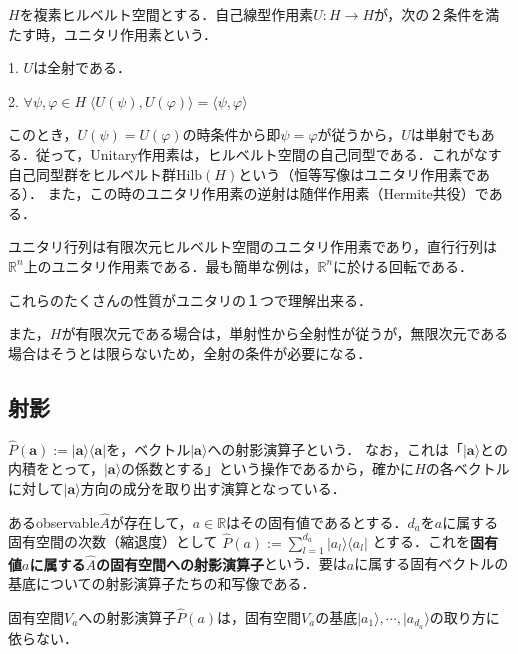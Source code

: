 \documentclass[uplatex, dvipdfmx]{jsreport}
\begin{document}
\begin{definition}
    $H$を複素ヒルベルト空間とする．自己線型作用素$U:H\to H$が，次の２条件を満たす時，ユニタリ作用素という．

    1. $U$は全射である．

    2. $\forall\psi,\varphi\in H\; \langle U(\psi),U(\varphi)\rangle =\langle\psi,\varphi\rangle $
\end{definition}
\begin{remark}
    このとき，$U(\psi)=U(\varphi)$の時条件から即$\psi=\varphi$が従うから，$U$は単射でもある．従って，Unitary作用素は，ヒルベルト空間の自己同型である．これがなす自己同型群をヒルベルト群$\mathrm{Hilb}(H)$という（恒等写像はユニタリ作用素である）．
    また，この時のユニタリ作用素の逆射は随伴作用素（Hermite共役）である．

    ユニタリ行列は有限次元ヒルベルト空間のユニタリ作用素であり，直行行列は$\mathbb{R}^n$上のユニタリ作用素である．最も簡単な例は，$\mathbb{R}^n$に於ける回転である．

    これらのたくさんの性質がユニタリの１つで理解出来る．

    また，$H$が有限次元である場合は，単射性から全射性が従うが，無限次元である場合はそうとは限らないため，全射の条件が必要になる．
\end{remark}

\subsection{射影}
\begin{definition}
    $\hat{P}(\mathbf{a}):=|\mathbf{a}\rangle\langle\mathbf{a}|$を，ベクトル$|\mathbf{a}\rangle$への射影演算子という．
    なお，これは「$|\mathbf{a}\rangle$との内積をとって，$|\mathbf{a}\rangle$の係数とする」という操作であるから，確かに$H$の各ベクトルに対して$|\mathbf{a}\rangle$方向の成分を取り出す演算となっている．
\end{definition}
\begin{definition}[固有空間への射影演算子]
    あるobservable$\hat{A}$が存在して，$a\in\mathbb{R}$はその固有値であるとする．$d_a$を$a$に属する固有空間の次数（縮退度）として
    $\hat{P}(a):=\sum_{l=1}^{d_a}|a_l\rangle\langle a_l|$
    とする．これを\textbf{固有値$a$に属する$\hat{A}$の固有空間への射影演算子}という．要は$a$に属する固有ベクトルの基底についての射影演算子たちの和写像である．
\end{definition}
\begin{proposition}
    固有空間$V_a$への射影演算子$\hat{P}(a)$は，固有空間$V_a$の基底$|a_1\rangle,\cdots,|a_{d_a}\rangle$の取り方に依らない．
\end{proposition}
\end{document}
